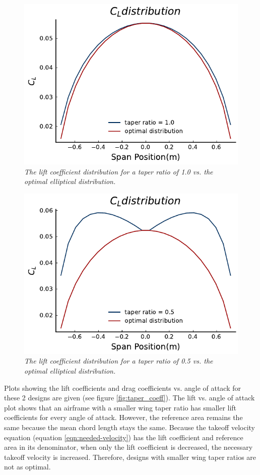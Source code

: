 \documentclass[journal]{new-aiaa}
\begin{document}
	\begin{figure}[H]
		\centering
		\includegraphics{../graphics/cl_dist.pdf}
		\caption{\emph{The lift coefficient distribution for a taper ratio of 1.0 vs. the optimal elliptical distribution.}}
		\label{fig:cl_dist}
	\end{figure}
	\begin{figure}[H]
		\centering
		\includegraphics{../graphics/cl_dist_compare.pdf}
		\caption{\emph{The lift coefficient distribution for a taper ratio of 0.5 vs. the optimal elliptical distribution.}}
		\label{fig:cl_dist_compare}
	\end{figure}
	
	Plots showing the lift coefficients and drag coefficients vs. angle of attack for these 2 designs are given (see figure \ref{fig:taper_coeff}). The lift vs. angle of attack plot shows that an airframe with a smaller wing taper ratio has smaller lift coefficients for every angle of attack. However, the reference area remains the same because the mean chord length stays the same. Because the takeoff velocity equation (equation \ref{eqn:needed-velocity}) has the lift coefficient and reference area in its denominator, when only the lift coefficient is decreased, the necessary takeoff velocity is increased. Therefore, designs with smaller wing taper ratios are not as optimal.\\
	
\end{document}
